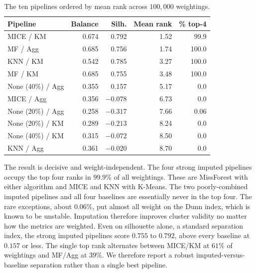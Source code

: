 \documentclass[conference]{IEEEtran}
\begin{document}
\begin{table}[H]
\centering
\caption{The ten pipelines ordered by mean rank across $100{,}000$ weightings.}
\label{tbl:rankdist}
\renewcommand{\arraystretch}{1.1}
\begin{tabular}{lrrrr}
\toprule
\textbf{Pipeline} & \textbf{Balance} & \textbf{Silh.} & \textbf{Mean rank} & \textbf{\% top-4} \\
\midrule
MICE / KM         & 0.674 & \phantom{$-$}0.792 & 1.52 & \phantom{0}99.9 \\
MF / Agg          & 0.685 & \phantom{$-$}0.756 & 1.74 & 100.0 \\
KNN / KM          & 0.542 & \phantom{$-$}0.785 & 3.27 & 100.0 \\
MF / KM           & 0.685 & \phantom{$-$}0.755 & 3.48 & 100.0 \\
\midrule
None (40\%) / Agg & 0.355 & \phantom{$-$}0.157 & 5.17 & \phantom{00}0.0 \\
MICE / Agg        & 0.356 & $-0.078$ & 6.73 & \phantom{00}0.0 \\
None (20\%) / Agg & 0.258 & $-0.317$ & 7.66 & \phantom{0}0.06 \\
None (20\%) / KM  & 0.289 & $-0.213$ & 8.24 & \phantom{00}0.0 \\
None (40\%) / KM  & 0.315 & $-0.072$ & 8.50 & \phantom{00}0.0 \\
KNN / Agg         & 0.361 & $-0.020$ & 8.70 & \phantom{00}0.0 \\
\bottomrule
\end{tabular}
\end{table}

The result is decisive and weight-independent. The four strong imputed pipelines occupy the top four ranks in $99.9\%$ of all weightings. These are MissForest with either algorithm and MICE and KNN with K-Means. The two poorly-combined imputed pipelines and all four baselines are essentially never in the top four. The rare exceptions, about $0.06\%$, put almost all weight on the Dunn index, which is known to be unstable. Imputation therefore improves cluster validity no matter how the metrics are weighted. Even on silhouette alone, a standard separation index, the strong imputed pipelines score $0.755$ to $0.792$, above every baseline at $0.157$ or less. The single top rank alternates between MICE/KM at $61\%$ of weightings and MF/Agg at $39\%$. We therefore report a robust imputed-versus-baseline separation rather than a single best pipeline.
\end{document}
